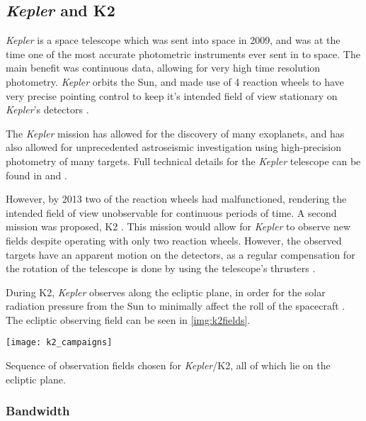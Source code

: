 \documentclass{book}
\begin{document}
\subsection{\textit{Kepler} and K2}

\textit{Kepler} is a space telescope which was sent into space in 2009, and was
at the time one of the most accurate photometric instruments ever sent in to space.
The main benefit was continuous data, allowing for very high time resolution
photometry. \textit{Kepler} orbits the Sun, and made use of 4 reaction wheels to
have very precise pointing control to keep it's intended field of view stationary
on \textit{Kepler}'s detectors \citep{NASA.KEPLER.HANDBOOK}.

The \textit{Kepler} mission has allowed for the discovery of many exoplanets,
and has also allowed for unprecedented astroseismic investigation using
high-precision photometry of many targets. Full technical details for the
\textit{Kepler} telescope can be found in \citet{2010ApJ...713L..87J} and
\citet{2010ApJ...713L..79K}.

However, by 2013 two of the reaction wheels had malfunctioned, rendering the
intended field of view unobservable for continuous periods of time. A second
mission was proposed, K2 \citep{2014PASP..126..398H}. This mission would allow
for \textit{Kepler} to observe new fields despite operating with only two
reaction wheels. However, the observed targets have an apparent motion on the
detectors, as a regular compensation for the rotation of the telescope is done
by using the telescope's thrusters \citep[Section 3]{2013.SHAO.K2}.

During K2, \textit{Kepler} observes along the ecliptic plane, in order for the
solar radiation pressure from the Sun to minimally affect the roll of the spacecraft
\citep{2014PASP..126..398H}. The ecliptic observing field can be seen in \autoref{img:k2fields}.

\begin{staticfigure}
	\centering
		\texttt{[image: k2\_campaigns]}
	\caption{Sequence of observation fields chosen for \textit{Kepler}/K2, all of
			 which lie on the ecliptic plane.}
	\label{img:k2fields}
\end{staticfigure}

\subsubsection{Bandwidth}
\label{section:bandwidth}
\end{document}
